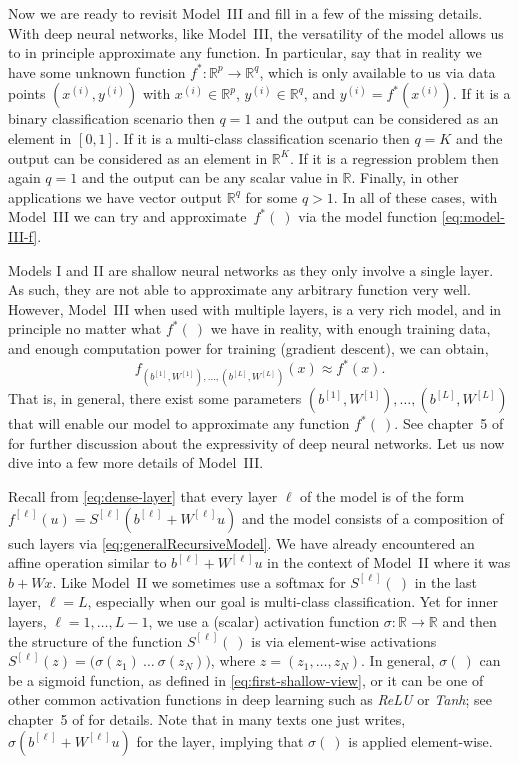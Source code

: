 \documentclass[12pt]{article}
\begin{document}
Now we are ready to revisit Model~III and fill in a few of the missing details. With deep neural networks, like Model~III, the versatility of the model allows us to in principle approximate any function. In particular, say that in reality we have some unknown function $f^*: \mathbb{R}^p \longrightarrow {\mathbb R}^q$, which is only available to us via data points $(x^{(i)}, y^{(i)})$ with $x^{(i)} \in {\mathbb R}^p$, $y^{(i)} \in {\mathbb R}^q$,  and $y^{(i)} = f^*(x^{(i)})$. If it is a binary classification scenario then $q=1$ and the output can be considered as an element in $[0,1]$. If it is a multi-class classification scenario then $q=K$ and the output can be considered as an element in ${\mathbb R}^K$. If it is a regression problem then again $q=1$ and the output can be any scalar value in ${\mathbb R}$. Finally, in other applications we have vector output ${\mathbb R}^q$ for some $q>1$. In all of these cases, with Model~III we can try and approximate~$f^*(~)$  via the model function \eqref{eq:model-III-f}.

Models I and II are shallow neural networks as they only involve a single layer. As such, they are not able to approximate any arbitrary function very well. However, Model~III when used with multiple layers, is a very rich model, and in principle no matter what $f^*(~)$ we have in reality, with enough training data, and enough computation power for training (gradient descent), we can obtain,
%
\begin{equation}
\label{eq:mod3-approx}
f_{(b^{[1]}, W^{[1]}), \ldots, (b^{[L]}, W^{[L]})} (x) \approx f^*(x).
\end{equation}
%
That is, in general, there exist some parameters ${(b^{[1]}, W^{[1]}), \ldots, (b^{[L]}, W^{[L]})}$ that will enable our model to approximate any function $f^*(~)$. See chapter~5 of \cite{LiquetMokaNazarathy2024DeepLearning} for further discussion about the expressivity of deep neural networks. Let us now dive into a few more details of Model~III.

Recall from  \eqref{eq:dense-layer} that every layer $\ell$ of the model is of the form $f^{[\ell]}(u) = S^{[\ell]}(b^{[\ell]} + W^{[\ell]} u)$ and the model consists of a composition of such layers via \eqref{eq:generalRecursiveModel}. We have already encountered an affine operation similar to $b^{[\ell]} + W^{[\ell]} u$ in the context of Model~II where it was $b + Wx$. Like Model~II we sometimes use a softmax for $S^{[\ell]}(~)$ in the last layer, $\ell=L$, especially when our goal is multi-class classification. Yet for inner layers, $\ell = 1,\ldots,L-1$, we use a (scalar) activation function $\sigma: \mathbb R \to \mathbb R$ and then the structure of the function $S^{[\ell]}(~)$ is via element-wise activations $S^{[\ell]}(z) = \big(\sigma\left(z_{1}\right) ~ \ldots ~\sigma\left(z_{N}\right)\big)$, where $z = (z_1, \ldots, z_N)$. In general, $\sigma(~)$ can be a sigmoid function, as defined in \eqref{eq:first-shallow-view}, or it can be one of other common activation functions in deep learning such as {\em ReLU} or {\em Tanh}; see chapter~5 of \cite{LiquetMokaNazarathy2024DeepLearning} for details. Note that in many texts one just writes, $\sigma(b^{[\ell]} + W^{[\ell]} u)$ for the layer, implying that $\sigma(~)$ is applied element-wise.
\end{document}

